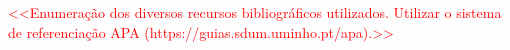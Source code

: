 \documentclass[a4paper,12pt]{scrreprt}
\begin{document}


\begin{thebibliography}{9}
\textcolor{red}{
    <<Enumeração dos diversos recursos bibliográficos utilizados. Utilizar o sistema de referenciação APA (https://guias.sdum.uminho.pt/apa).>>
}
\end{thebibliography}



\renewcommand{\nomname}{Lista de Siglas e Acrónimos}



\printnomenclature



\end{document}

